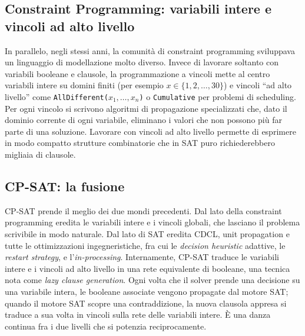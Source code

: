 \subsection{Constraint Programming: variabili intere e vincoli ad alto livello}

In parallelo, negli stessi anni, la comunit\`a di constraint
programming sviluppava un linguaggio di modellazione molto
diverso. Invece di lavorare soltanto con variabili booleane
e clausole, la programmazione a vincoli mette al centro
variabili intere su domini finiti (per esempio
$x \in \{1, 2, \ldots, 30\}$) e vincoli ``ad alto livello''
come \texttt{AllDifferent($x_1, \ldots, x_n$)} o
\texttt{Cumulative} per problemi di scheduling. Per ogni
vincolo si scrivono algoritmi di propagazione specializzati
che, dato il dominio corrente di ogni variabile, eliminano
i valori che non possono pi\`u far parte di una soluzione.
Lavorare con vincoli ad alto livello permette di esprimere
in modo compatto strutture combinatorie che in SAT puro
richiederebbero migliaia di clausole.

\subsection{CP-SAT: la fusione}

CP-SAT prende il meglio dei due mondi precedenti. Dal lato
della constraint programming eredita le variabili intere e
i vincoli globali, che lasciano il problema scrivibile in
modo naturale. Dal lato di SAT eredita CDCL, unit
propagation e tutte le ottimizzazioni ingegneristiche, fra
cui le \emph{decision heuristic} adattive, le \emph{restart
strategy}, e l'\emph{in-processing}. Internamente, CP-SAT
traduce le variabili intere e i vincoli ad alto livello in
una rete equivalente di booleane, una tecnica nota come
\emph{lazy clause generation}. Ogni volta che il solver
prende una decisione su una variabile intera, le booleane
associate vengono propagate dal motore SAT; quando il
motore SAT scopre una contraddizione, la nuova clausola
appresa si traduce a sua volta in vincoli sulla rete delle
variabili intere. \`E una danza continua fra i due livelli
che si potenzia reciprocamente.

